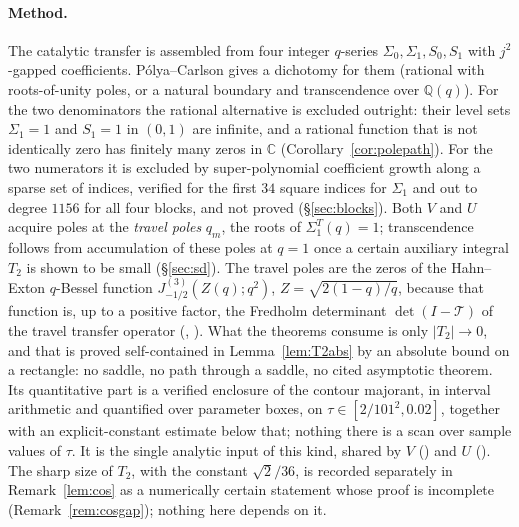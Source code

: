 \documentclass[11pt]{article}
\theoremstyle{plain}
\theoremstyle{definition}
\theoremstyle{remark}
\newcommand{\Q}{\mathbb{Q}}
\newcommand{\C}{\mathbb{C}}
\begin{document}
\paragraph{Method.} The catalytic transfer is assembled from four integer $q$-series
$\Sigma_0,\Sigma_1,S_0,S_1$ with $j^2$-gapped coefficients. P\'olya--Carlson gives a dichotomy for
them (rational with roots-of-unity poles, or a natural boundary and transcendence over $\Q(q)$).
For the two denominators the rational alternative is excluded outright: their level sets
$\Sigma_1=1$ and $S_1=1$ in $(0,1)$ are infinite, and a rational function that is not identically
zero has finitely many zeros in $\C$ (Corollary~\ref{cor:polepath}). For the two numerators it is
excluded by super-polynomial coefficient growth along a sparse set of
indices, verified for the first $34$ square indices for $\Sigma_1$ and out to degree $1156$ for all
four blocks, and not proved (\S\ref{sec:blocks}).
Both $V$ and $U$ acquire poles at the \emph{travel poles} $q_m$, the roots of
$\Sigma_1^T(q)=1$; transcendence follows from accumulation of these poles at $q=1$ once a certain
auxiliary integral $T_2$ is shown to be small (\S\ref{sec:sd}). The travel poles are the zeros of
the Hahn--Exton $q$-Bessel function $J^{(3)}_{-1/2}(Z(q);q^2)$, $Z=\sqrt{2(1-q)/q}$, because that
function is, up to a positive factor, the Fredholm determinant $\det(I-\mathcal T)$ of the travel
transfer operator ({\cite[Theorem ``the travel determinant'', \textup{thm:fredholm}]{Bonfioli2026bA}}, {\cite[Corollary ``the travel poles are Hahn--Exton zeros'', \textup{cor:qbessel}]{Bonfioli2026bA}}). What the theorems consume is only
$|T_2|\to0$, and that is proved self-contained in Lemma~\ref{lem:T2abs} by an absolute bound on a
rectangle: no saddle, no path through a saddle, no cited asymptotic theorem. Its quantitative part
is a verified enclosure of the contour majorant, in interval arithmetic and quantified over
parameter boxes, on $\tau\in[2/101^2,0.02]$, together with an explicit-constant estimate below
that; nothing there is a scan over sample values of $\tau$. It is the single
analytic input of this kind, shared by $V$ ({\cite[\S\,\textup{sec:V}]{Bonfioli2026bA}}) and $U$ ({\cite[\S\,\textup{sec:U}]{Bonfioli2026bA}}). The sharp size
of $T_2$, with the constant $\sqrt2/36$, is recorded separately in Remark~\ref{lem:cos} as a
numerically certain statement whose proof is incomplete (Remark~\ref{rem:cosgap}); nothing here
depends on it.
\end{document}
